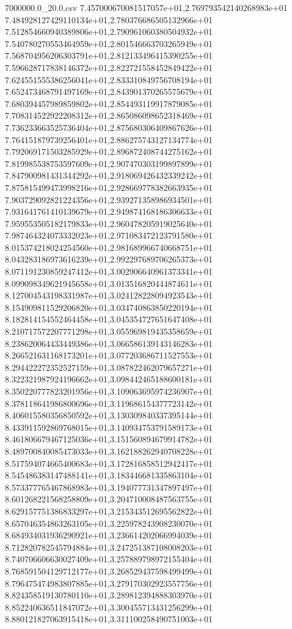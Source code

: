 \begin{filecontents*}{7000000.0_20.0.csv}
7.457000670081517057e+01,2.769793542140268983e+01
7.484928127429110134e+01,2.780376686505132966e+01
7.512854660940389806e+01,2.790961060380504932e+01
7.540780270553464959e+01,2.801546663703265949e+01
7.568704956206303791e+01,2.812133496415390255e+01
7.596628717838146372e+01,2.822721558452849422e+01
7.624551555386256041e+01,2.833310849756708194e+01
7.652473468791497169e+01,2.843901370265575679e+01
7.680394457989859802e+01,2.854493119917879085e+01
7.708314522922208312e+01,2.865086098652318469e+01
7.736233663525736404e+01,2.875680306409867626e+01
7.764151879739256401e+01,2.886275743127134774e+01
7.792069171503285929e+01,2.896872408744275162e+01
7.819985538753597609e+01,2.907470303199897899e+01
7.847900981431344292e+01,2.918069426432339242e+01
7.875815499473998216e+01,2.928669778382663935e+01
7.903729092821224356e+01,2.939271358986934501e+01
7.931641761410139679e+01,2.949874168186306633e+01
7.959553505182179833e+01,2.960478205919025640e+01
7.987464324073332023e+01,2.971083472123791580e+01
8.015374218024254560e+01,2.981689966740668751e+01
8.043283186973616239e+01,2.992297689706265373e+01
8.071191230859247412e+01,3.002906640961373341e+01
8.099098349621945658e+01,3.013516820444874611e+01
8.127004543198331987e+01,3.024128228094923543e+01
8.154909811529206820e+01,3.034740863850220194e+01
8.182814154552464458e+01,3.045354727651647408e+01
8.210717572207771298e+01,3.055969819435358659e+01
8.238620064433449386e+01,3.066586139143146283e+01
8.266521631168173201e+01,3.077203686711527553e+01
8.294422272352527159e+01,3.087822462079657271e+01
8.322321987924196662e+01,3.098442465188600181e+01
8.350220777823201956e+01,3.109063695974236907e+01
8.378118641986800696e+01,3.119686154377723142e+01
8.406015580356850592e+01,3.130309840337395144e+01
8.433911592869768015e+01,3.140934753791589173e+01
8.461806679467125036e+01,3.151560894679914782e+01
8.489700840085473033e+01,3.162188262940708228e+01
8.517594074665400683e+01,3.172816858512942417e+01
8.545486383147488141e+01,3.183446681335863104e+01
8.573377765467868983e+01,3.194077731347897497e+01
8.601268221568258809e+01,3.204710008487563755e+01
8.629157751386833297e+01,3.215343512695562822e+01
8.657046354863263105e+01,3.225978243908230070e+01
8.684934031936290921e+01,3.236614202066994039e+01
8.712820782545794884e+01,3.247251387108008203e+01
8.740706606630027409e+01,3.257889798972155404e+01
8.768591504129712177e+01,3.268529437598499499e+01
8.796475474983807885e+01,3.279170302923557756e+01
8.824358519130780110e+01,3.289812394888303970e+01
8.852240636511847072e+01,3.300455713431256299e+01
8.880121827063915418e+01,3.311100258490751003e+01

\end{filecontents*}
